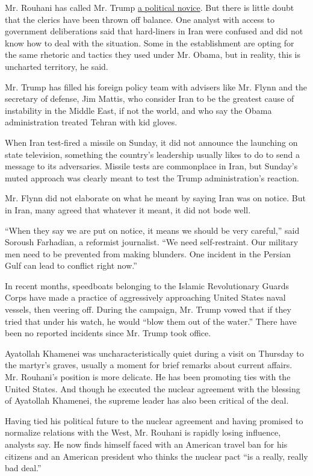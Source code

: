 Mr. Rouhani has called Mr. Trump
\href{http://www.reuters.com/article/us-usa-trump-immigration-iran-idUSKBN15G3NK}{a
political novice}. But there is little doubt that the clerics have been
thrown off balance. One analyst with access to government deliberations
said that hard-liners in Iran were confused and did not know how to deal
with the situation. Some in the establishment are opting for the same
rhetoric and tactics they used under Mr. Obama, but in reality, this is
uncharted territory, he said.

Mr. Trump has filled his foreign policy team with advisers like Mr.
Flynn and the secretary of defense, Jim Mattis, who consider Iran to be
the greatest cause of instability in the Middle East, if not the world,
and who say the Obama administration treated Tehran with kid gloves.

When Iran test-fired a missile on Sunday, it did not announce the
launching on state television, something the country's leadership
usually likes to do to send a message to its adversaries. Missile tests
are commonplace in Iran, but Sunday's muted approach was clearly meant
to test the Trump administration's reaction.

Mr. Flynn did not elaborate on what he meant by saying Iran was on
notice. But in Iran, many agreed that whatever it meant, it did not bode
well.

``When they say we are put on notice, it means we should be very
careful,'' said Soroush Farhadian, a reformist journalist. ``We need
self-restraint. Our military men need to be prevented from making
blunders. One incident in the Persian Gulf can lead to conflict right
now.''

In recent months, speedboats belonging to the Islamic Revolutionary
Guards Corps have made a practice of aggressively approaching United
States naval vessels, then veering off. During the campaign, Mr. Trump
vowed that if they tried that under his watch, he would ``blow them out
of the water.'' There have been no reported incidents since Mr. Trump
took office.

Ayatollah Khamenei was uncharacteristically quiet during a visit on
Thursday to the martyr's graves, usually a moment for brief remarks
about current affairs. Mr. Rouhani's position is more delicate. He has
been promoting ties with the United States. And though he executed the
nuclear agreement with the blessing of Ayatollah Khamenei, the supreme
leader has also been critical of the deal.

Having tied his political future to the nuclear agreement and having
promised to normalize relations with the West, Mr. Rouhani is rapidly
losing influence, analysts say. He now finds himself faced with an
American travel ban for his citizens and an American president who
thinks the nuclear pact ``is a really, really bad deal.''

